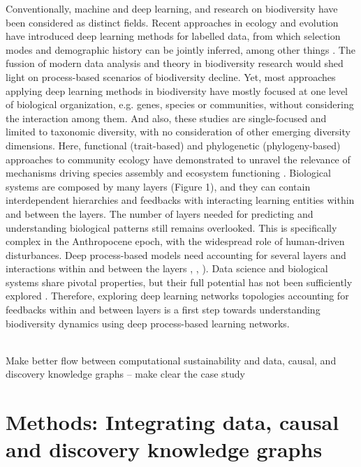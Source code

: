 \documentclass[12pt,a4paper]{article}
\begin{document}
Conventionally, machine and deep learning, and research on
biodiversity have been considered as distinct fields. Recent
approaches in ecology and evolution have introduced deep learning
methods for labelled data, from which selection modes and demographic
history can be jointly inferred, among other things \citep{sheehan2016deep}. The fussion
of modern data analysis and theory in biodiversity research would shed
light on process-based scenarios of biodiversity decline. Yet, most approaches applying deep learning methods in biodiversity have mostly focused at one level of biological organization, e.g. genes, species
or communities, without considering the interaction among them. And
also, these studies are single-focused and limited to taxonomic
diversity, with no consideration of other emerging diversity
dimensions. Here, functional (trait-based) and phylogenetic
(phylogeny-based) approaches to community ecology have demonstrated to unravel the relevance of mechanisms driving species assembly and ecosystem functioning \citep{weiss2019unifying}. Biological systems are composed by many layers (Figure 1), and they can contain interdependent hierarchies and feedbacks with interacting learning
entities within and between the layers. The number of layers needed for predicting and understanding biological patterns still remains overlooked. This is specifically complex in the Anthropocene epoch, with the widespread role of human-driven disturbances. Deep process-based models need accounting for several layers and interactions within and between the layers \citep{fontaine2011ecological}, \citep{melian2018deciphering},
\citep{reichstein2019deep}). Data science and biological systems share
pivotal properties, but their full potential has not been sufficiently
explored \citep{schmidhuber2015deep}. Therefore, exploring deep
learning networks topologies accounting for feedbacks within and
between layers is a first step towards understanding biodiversity
dynamics using deep process-based learning networks.

\\
Make better flow between computational sustainability and data, causal, and discovery knowledge graphs -- make clear the case study
\\

\section{Methods: Integrating data, causal and discovery knowledge graphs}
\end{document}
